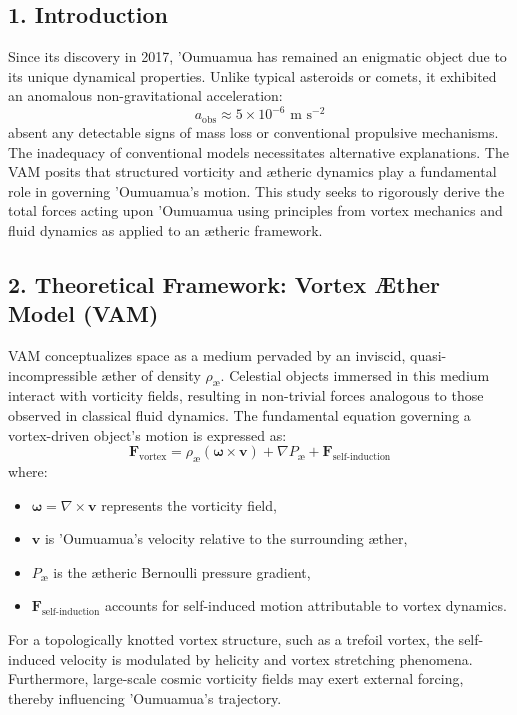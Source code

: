\documentclass[a4paper,10pt]{article}
\begin{document}
    \subsection*{1. Introduction}
    Since its discovery in 2017, 'Oumuamua has remained an enigmatic object due to its unique dynamical properties. Unlike typical asteroids or comets, it exhibited an anomalous non-gravitational acceleration:
    \begin{equation*}
        a_\text{obs} \approx 5 \times 10^{-6} \text{ m s}^{-2}
    \end{equation*}
    absent any detectable signs of mass loss or conventional propulsive mechanisms. The inadequacy of conventional models necessitates alternative explanations. The VAM posits that structured vorticity and ætheric dynamics play a fundamental role in governing 'Oumuamua's motion. This study seeks to rigorously derive the total forces acting upon 'Oumuamua using principles from vortex mechanics and fluid dynamics as applied to an ætheric framework.

    \subsection*{2. Theoretical Framework: Vortex Æther Model (VAM)}
    VAM conceptualizes space as a medium pervaded by an inviscid, quasi-incompressible æther of density $\rho_\text{\ae}$. Celestial objects immersed in this medium interact with vorticity fields, resulting in non-trivial forces analogous to those observed in classical fluid dynamics. The fundamental equation governing a vortex-driven object's motion is expressed as:
    \begin{equation*}
        \mathbf{F}_\text{vortex} = \rho_\text{\ae} (\mathbf{\omega} \times \mathbf{v}) + \nabla P_\text{\ae} + \mathbf{F}_\text{self-induction}
    \end{equation*}
    where:
    \begin{itemize}
        \item $\mathbf{\omega} = \nabla \times \mathbf{v}$ represents the vorticity field,
        \item $\mathbf{v}$ is 'Oumuamua's velocity relative to the surrounding æther,
        \item $P_\text{\ae}$ is the ætheric Bernoulli pressure gradient,
        \item $\mathbf{F}_\text{self-induction}$ accounts for self-induced motion attributable to vortex dynamics.
    \end{itemize}
    For a topologically knotted vortex structure, such as a trefoil vortex, the self-induced velocity is modulated by helicity and vortex stretching phenomena. Furthermore, large-scale cosmic vorticity fields may exert external forcing, thereby influencing 'Oumuamua's trajectory.
\end{document}

